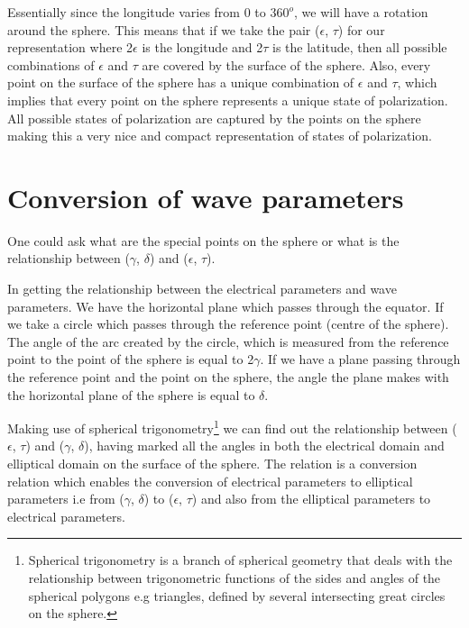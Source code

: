 Essentially since the longitude varies from 0 to $360^{o}$, we will have a rotation around the sphere. This means that if we take the pair ($\epsilon$, $\tau$) for our representation where  2$\epsilon$ is the longitude and 2$\tau$ is the latitude, then all possible combinations of $\epsilon$ and $\tau$ are covered by the surface of the sphere.	Also, every point on the surface of the sphere has a unique combination of $\epsilon$ and $\tau$, which implies that every point on the sphere represents a unique state of polarization. All possible states of polarization are captured by the points on the sphere making this a very nice and compact representation of states of polarization.


\section{Conversion of wave parameters}
One could ask what are the special points on the sphere or what is the relationship between ($\gamma$, $\delta$) and ($\epsilon$, $\tau$).  

In getting the relationship between the electrical parameters and wave parameters. We have the horizontal plane which passes through the equator.
If we take a circle which passes through the reference point (centre of the sphere). The angle of the arc created by the circle, which is measured from the reference point to the point of the sphere is equal to 2$\gamma$.
If we have a plane passing through the reference point and the point on the sphere, the angle the plane makes with the horizontal plane of the sphere is equal to $\delta$.

Making use of spherical trigonometry\footnote{Spherical trigonometry is a branch of spherical geometry that deals with the relationship between trigonometric functions of the sides and angles of the spherical polygons e.g triangles, defined by several intersecting great circles on the sphere.} we can find out the relationship between ($\epsilon$, $\tau$) and ($\gamma$, $\delta$), having marked all the angles in both the electrical domain and elliptical domain on the surface of the sphere. The relation is a conversion relation which enables the conversion of electrical parameters to elliptical parameters i.e from ($\gamma$, $\delta$) to ($\epsilon$, $\tau$) and also from the elliptical parameters to electrical parameters.

